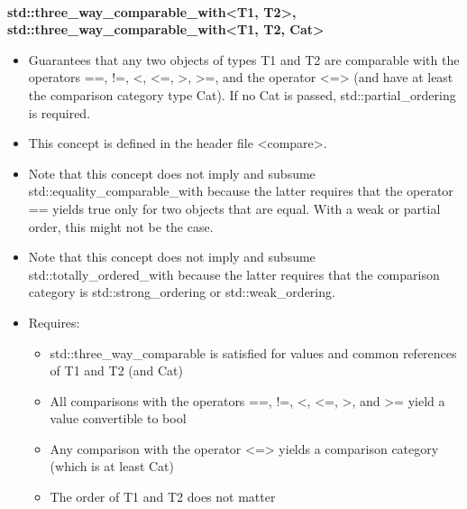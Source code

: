 \noindent
\hspace*{\fill} \\ %
\textbf{std::three\_way\_comparable\_with<T1, T2>, 	std::three\_way\_comparable\_with<T1, T2, Cat>}

\begin{itemize}
\item
Guarantees that any two objects of types T1 and T2 are comparable with the operators ==, !=, <, <=, >, >=, and the operator <=> (and have at least the comparison category type Cat). If no Cat is passed, std::partial\_ordering is required.

\item
This concept is defined in the header file <compare>.

\item
Note that this concept does not imply and subsume std::equality\_comparable\_with because the latter requires that the operator == yields true only for two objects that are equal. With a weak or partial order, this might not be the case.

\item
Note that this concept does not imply and subsume std::totally\_ordered\_with because the latter requires that the comparison category is std::strong\_ordering or std::weak\_ordering.

\item
Requires:
\begin{itemize}
\item
std::three\_way\_comparable is satisfied for values and common references of T1 and T2 (and Cat)

\item
All comparisons with the operators ==, !=, <, <=, >, and >= yield a value convertible to bool

\item
Any comparison with the operator <=> yields a comparison category (which is at least Cat)

\item
The order of T1 and T2 does not matter
\end{itemize}
\end{itemize}




